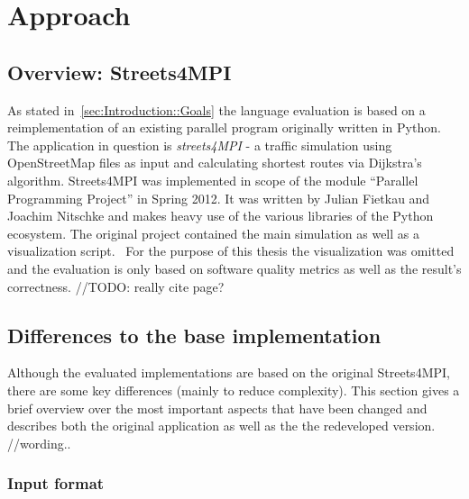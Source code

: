 \chapter{Approach}
\label{chap:Approach}


\section{Overview: Streets4MPI}
\label{sec:Approach::Overview}

As stated in~\autoref{sec:Introduction::Goals} the language evaluation is based on a reimplementation of an existing parallel program originally written in Python. The application in question is \textit{streets4MPI} - a traffic simulation using OpenStreetMap files as input and calculating shortest routes via Dijkstra's algorithm. Streets4MPI was implemented in scope of the module ``Parallel Programming Project'' in Spring 2012. It was written by Julian Fietkau and Joachim Nitschke and makes heavy use of the various libraries of the Python ecosystem. The original project contained the main simulation as well as a visualization script.~\cite[p.~3]{streets_report} For the purpose of this thesis the visualization was omitted and the evaluation is only based on software quality metrics as well as the result's correctness. //TODO: really cite page?

\section{Differences to the base implementation}
\label{sec:Approach::Differences}

Although the evaluated implementations are based on the original Streets4MPI, there are some key differences (mainly to reduce complexity). This section gives a brief overview over the most important aspects that have been changed and describes both the original application as well as the the redeveloped version. //wording..

\subsection*{Input format}
\label{subsec:Approach::Differences::Input}

